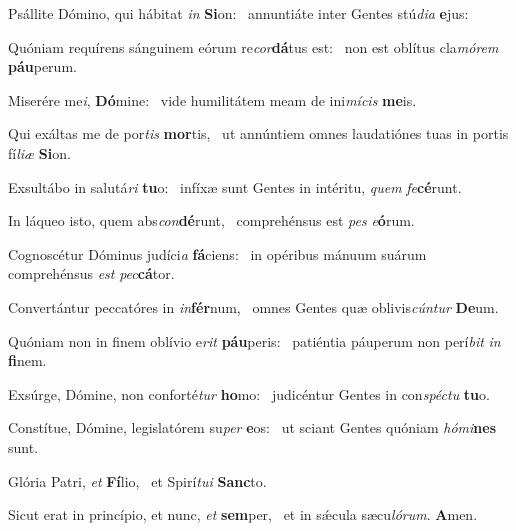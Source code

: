\item Psállite Dómino, qui hábitat \textit{in} \textbf{Si}on:~\psstar{} annuntiáte inter Gentes stú\textit{di}\textit{a} \textbf{e}jus:
\item Quóniam requírens sánguinem eórum re\textit{cor}\textbf{dá}tus est:~\psstar{} non est oblítus cla\textit{mó}\textit{rem} \textbf{páu}perum.
\item Miserére me\textit{i}, \textbf{Dó}mine:~\psstar{} vide humilitátem meam de ini\textit{mí}\textit{cis} \textbf{me}is.
\item Qui exáltas me de por\textit{tis} \textbf{mor}tis,~\psstar{} ut annúntiem omnes laudatiónes tuas in portis fí\textit{li}\textit{æ} \textbf{Si}on.
\item Exsultábo in salutá\textit{ri} \textbf{tu}o:~\psstar{} infíxæ sunt Gentes in intéritu, \textit{quem} \textit{fe}\textbf{cé}runt.
\item In láqueo isto, quem abs\textit{con}\textbf{dé}runt,~\psstar{} comprehénsus est \textit{pes} \textit{e}\textbf{ó}rum.
\item Cognoscétur Dóminus judíci\textit{a} \textbf{fá}ciens:~\psstar{} in opéribus mánuum suárum comprehénsus \textit{est} \textit{pec}\textbf{cá}tor.
\item Convertántur peccatóres in \textit{in}\textbf{fér}num,~\psstar{} omnes Gentes quæ oblivis\textit{cún}\textit{tur} \textbf{De}um.
\item Quóniam non in finem oblívio e\textit{rit} \textbf{páu}peris:~\psstar{} patiéntia páuperum non perí\textit{bit} \textit{in} \textbf{fi}nem.
\item Exsúrge, Dómine, non conforté\textit{tur} \textbf{ho}mo:~\psstar{} judicéntur Gentes in con\textit{spéctu} \textbf{tu}o.
\item Constítue, Dómine, legislatórem su\textit{per} \textbf{e}os:~\psstar{} ut sciant Gentes quóniam \textit{hómi}\textbf{nes} sunt.
\item Glória Patri, \textit{et} \textbf{Fí}lio,~\psstar{} et Spirí\textit{tu}\textit{i} \textbf{Sanc}to.
\item Sicut erat in princípio, et nunc, \textit{et} \textbf{sem}per,~\psstar{} et in sǽcula sæcu\textit{ló}\textit{rum}. \textbf{A}men.
